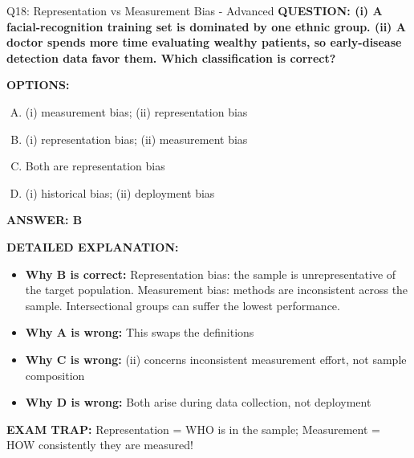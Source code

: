 \documentclass[8pt]{beamer}
\begin{document}
\begin{frame}[shrink=6]{Q18: Representation vs Measurement Bias - Advanced}
\fontsize{6.5}{7.5}\selectfont
\textbf{QUESTION: (i) A facial-recognition training set is dominated by one ethnic group. (ii) A doctor spends more time evaluating wealthy patients, so early-disease detection data favor them. Which classification is correct?}

\vspace{0.1cm}
\textbf{OPTIONS:}
\begin{enumerate}[A.]
\item (i) measurement bias; (ii) representation bias
\item (i) representation bias; (ii) measurement bias
\item Both are representation bias
\item (i) historical bias; (ii) deployment bias
\end{enumerate}

\vspace{0.1cm}
\textcolor{myblue}{\textbf{ANSWER: B}}

\vspace{0.1cm}
\textbf{DETAILED EXPLANATION:}
\begin{itemize}
\item \textbf{Why B is correct:} Representation bias: the sample is unrepresentative of the target population. Measurement bias: methods are inconsistent across the sample. Intersectional groups can suffer the lowest performance.
\item \textbf{Why A is wrong:} This swaps the definitions
\item \textbf{Why C is wrong:} (ii) concerns inconsistent measurement effort, not sample composition
\item \textbf{Why D is wrong:} Both arise during data collection, not deployment
\end{itemize}

\textcolor{myred}{\textbf{EXAM TRAP:}} Representation = WHO is in the sample; Measurement = HOW consistently they are measured!
\end{frame}
\end{document}
